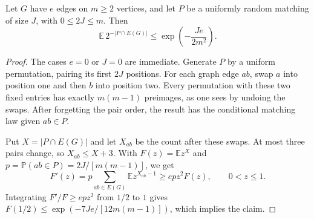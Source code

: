 \begin{lemma}\label{lem:fixed-pair-matching}
Let $G$ have $e$ edges on $m\ge2$ vertices, and let $P$ be a uniformly
random matching of size $J$, with $0\le2J\le m$. Then
\[
 \mathbb E\,2^{-|P\cap E(G)|}\le\exp\!\left(-\frac{Je}{2m^2}\right).
\]
\end{lemma}
\begin{proof}
The cases $e=0$ or $J=0$ are immediate. Generate $P$ by a uniform
permutation, pairing its first $2J$ positions. For each graph edge $ab$,
swap $a$ into position one and then $b$ into position two. Every
permutation with these two fixed entries has exactly $m(m-1)$ preimages,
as one sees by undoing the swaps. After forgetting the pair order, the
result has the conditional matching law given $ab\in P$.

Put $X=|P\cap E(G)|$ and let $X_{ab}$ be the count after these swaps.
At most three pairs change, so $X_{ab}\le X+3$. With
$F(z)=\mathbb E z^X$ and $p=\mathbb P(ab\in P)=2J/[m(m-1)]$, we get
\[
 F'(z)=p\sum_{ab\in E(G)}\mathbb E z^{X_{ab}-1}
       \ge epz^2F(z),\qquad 0<z\le1.
\]
Integrating $F'/F\ge epz^2$ from $1/2$ to $1$ gives
$F(1/2)\le\exp(-7Je/[12m(m-1)])$, which implies the claim.
\end{proof}

